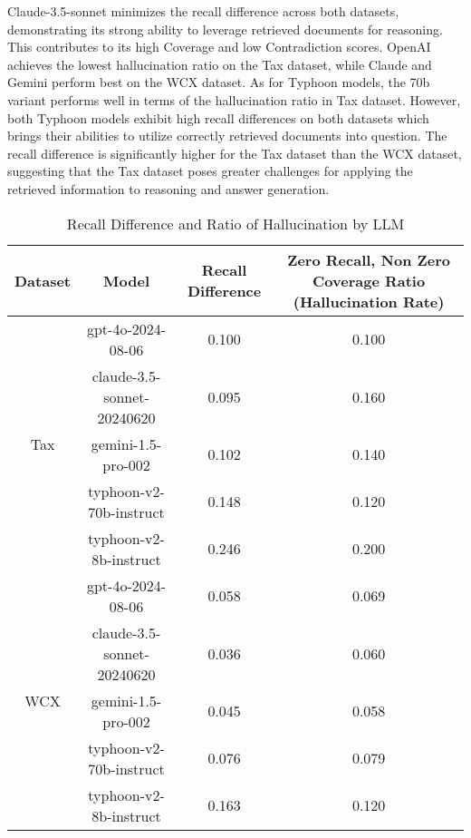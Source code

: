 Claude-3.5-sonnet minimizes the recall difference across both datasets, demonstrating its strong ability to leverage retrieved documents for reasoning. This contributes to its high Coverage and low Contradiction scores. OpenAI achieves the lowest hallucination ratio on the Tax dataset, while Claude and Gemini perform best on the WCX dataset. As for Typhoon models, the 70b variant performs well in terms of the hallucination ratio in Tax dataset. However, both Typhoon models exhibit high recall differences on both datasets which brings their abilities to utilize correctly retrieved documents into question. The recall difference is significantly higher for the Tax dataset than the WCX dataset, suggesting that the Tax dataset poses greater challenges for applying the retrieved information to reasoning and answer generation.



\begin{table}[ht]
\centering
\caption{Recall Difference and Ratio of Hallucination by LLM}
\renewcommand{\arraystretch}{1.5} %
\label{table: llm_e2e_recall_diff}
\begin{tabular}{@{}c|ccc@{}}
\toprule
Dataset              & Model                      & Recall Difference & Zero Recall, Non Zero Coverage Ratio (Hallucination Rate) \\ \midrule
\multirow{5}{*}{Tax} & gpt-4o-2024-08-06          & 0.100             & 0.100                                \\
                     & claude-3.5-sonnet-20240620 & 0.095             & 0.160                                \\
                     & gemini-1.5-pro-002         & 0.102             & 0.140                                \\
                     & typhoon-v2-70b-instruct    & 0.148             & 0.120                                \\
                     & typhoon-v2-8b-instruct     & 0.246             & 0.200                                \\ \midrule
\multirow{5}{*}{WCX} & gpt-4o-2024-08-06          & 0.058             & 0.069                                \\
                     & claude-3.5-sonnet-20240620 & 0.036             & 0.060                                \\
                     & gemini-1.5-pro-002         & 0.045             & 0.058                                \\
                     & typhoon-v2-70b-instruct    & 0.076             & 0.079                                \\
                     & typhoon-v2-8b-instruct     & 0.163             & 0.120                                \\ \bottomrule
\end{tabular}
\end{table}

